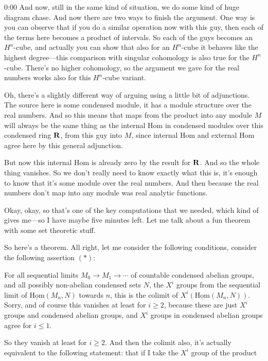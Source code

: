 \begin{unfinished}{0:00}
And now, still in the same kind of situation, we do some kind of huge diagram chase. And now there are two ways to finish the argument. One way is you can observe that if you do a similar operation now with this guy, then each of the terms here becomes a product of intervals. So each of the guys becomes an $H^n$-cube, and actually you can show that also for an $H^n$-cube it behaves like the highest degree---this comparison with singular cohomology is also true for the $H^n$-cube. There's no higher cohomology, so the argument we gave for the real numbers works also for this $H^n$-cube variant.

Oh, there's a slightly different way of arguing using a little bit of adjunctions. The source here is some condensed module, it has a module structure over the real numbers. And so this means that maps from the product into any module $M$ will always be the same thing as the internal $\mathrm{Hom}$ in condensed modules over this condensed ring $\mathbf R$, from this guy into $M$, since internal $\mathrm{Hom}$ and external $\mathrm{Hom}$ agree here by this general adjunction.

But now this internal $\mathrm{Hom}$ is already zero by the result for $\mathbf R$. And so the whole thing vanishes. So we don't really need to know exactly what this is, it's enough to know that it's some module over the real numbers. And then because the real numbers don't map into any module was real analytic functions.

Okay, okay, so that's one of the key computations that we needed, which kind of gives me---so I have maybe five minutes left. Let me talk about a fun theorem with some set theoretic stuff.

So here's a theorem. All right, let me consider the following conditions, consider the following assertion $(\ast)$:

For all sequential limits $M_0 \to M_1 \to \cdots$ of countable condensed abelian groups, and all possibly non-abelian condensed sets $N$, the $X^i$ groups from the sequential limit of $\underline{\mathrm{Hom}}(M_n, N)$ towards $n$, this is the colimit of $X^i(\underline{\mathrm{Hom}}(M_n, N))$. Sorry, and of course this vanishes at least for $i \geq 2$, because these are just $X^i$ groups and condensed abelian groups, and $X^i$ groups in condensed abelian groups agree for $i \leq 1$.

So they vanish at least for $i \geq 2$. And then the colimit also, it's actually equivalent to the following statement: that if I take the $X^i$ group of the product 


\end{unfinished}

